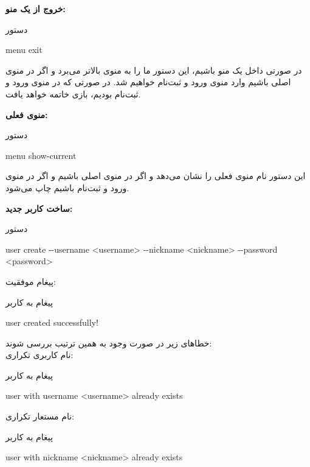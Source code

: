 \documentclass[]{article}
\begin{document}
\vspace{.5cm}
\textbf{خروج از یک منو:}
\begin{mybox}[colback=yellow]{دستور}
	\begin{latin}	
		menu exit
	\end{latin}
\end{mybox}
در صورتی داخل یک منو باشیم، این دستور ما را به منوی بالاتر می‌برد و اگر در 
منوی اصلی باشیم وارد منوی ورود و ثبت‌نام خواهیم شد. در صورتی که در منوی 
ورود 
و ثبت‌نام بودیم، بازی خاتمه خواهد یافت.

\vspace{.5cm}
\textbf{منوی فعلی:}
\begin{mybox}[colback=yellow]{دستور}
	\begin{latin}	
		menu show-current 
	\end{latin}
\end{mybox}
این دستور نام منوی فعلی را نشان می‌دهد و اگر در منوی اصلی باشیم 
 و اگر در منوی ورود و ثبت‌نام باشیم  چاپ می‌شود.

\vspace{.5cm}
\textbf{ساخت کاربر جدید:}
\begin{mybox}[colback=yellow]{دستور}
	\begin{latin}	
		user create -{}-username <username> -{}-nickname <nickname> 
		-{}-password 
		<password>
	\end{latin}
\end{mybox}
پیغام موفقیت:
\begin{mybox}[colback=yellow]{پیغام به کاربر}
	\begin{latin}	
		user created successfully!
	\end{latin}
\end{mybox}
خطا‌های زیر در صورت وجود به همین ترتیب بررسی شوند:
\\
نام کاربری تکراری:
\begin{mybox}[colback=yellow]{پیغام به کاربر}
	\begin{latin}	
		user with username <username> already exists
	\end{latin}
\end{mybox}
نام مستعار تکراری:
\begin{mybox}[colback=yellow]{پیغام به کاربر}
	\begin{latin}	
		user with nickname <nickname> already exists
	\end{latin}
\end{mybox}
\end{document}
